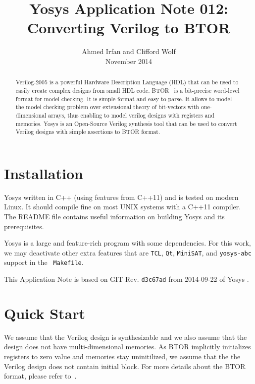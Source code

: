 \documentclass[9pt,technote,a4paper]{IEEEtran}
\begin{document}
\title{Yosys Application Note 012: \\ Converting Verilog to BTOR}
\author{Ahmed Irfan and Clifford Wolf \\ November 2014}
\maketitle

\begin{abstract}
Verilog-2005 is a powerful Hardware Description Language (HDL) that
can be used to easily create complex designs from small HDL code. 
BTOR~\cite{btor} is a bit-precise word-level format for model
checking.  It is simple format and easy to parse.  It allows to model
the model checking problem over extensional theory of bit-vectors with
one-dimensional arrays, thus enabling to model verilog designs with
registers and memories.
Yosys \cite{yosys} is an Open-Source Verilog synthesis tool that can
be used to convert Verilog designs with simple assertions to BTOR format.

\end{abstract}

\section{Installation}

Yosys written in C++ (using features from C++11) and is tested on
modern Linux.  It should compile fine on most UNIX systems with a
C++11 compiler. The README file contains useful information on
building Yosys and its prerequisites.

Yosys is a large and feature-rich program with some dependencies. For
this work, we may deactivate other extra features that are {\tt TCL},
{\tt Qt}, {\tt MiniSAT}, and {\tt yosys-abc} support in the {\tt
  Makefile}.

\bigskip

This Application Note is based on GIT Rev. {\tt d3c67ad} from
2014-09-22 of Yosys \cite{yosys}.

\section{Quick Start}

We assume that the Verilog design is synthesizable and we also assume
that the design does not have multi-dimensional memories.  As BTOR
implicitly initializes registers to zero value and memories stay
uninitilized, we assume that the the Verilog design does
not contain initial block. For more details about the BTOR format,
please refer to~\cite{btor}.
\end{document}
